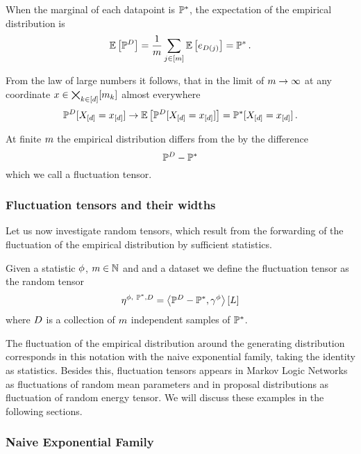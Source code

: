 When the marginal of each datapoint is $\mathbb{P}^*$, the expectation of the empirical distribution is
\begin{align*}
	\mathbb{E}\left[\mathbb{P}^{D}\right] 
	= \frac{1}{m} \sum_{j\in[m]}  \mathbb{E}\left[e_{D(j)}\right]
	= \mathbb{P}^* \, . 
\end{align*}

From the law of large numbers it follows, that in the limit of $m\rightarrow\infty$ at any coordinate $x\in\bigtimes_{k\in[d]}[m_{k}]$ almost everywhere
	\[ \mathbb{P}^{D}[X_{[d]}=x_{[d]}] \rightarrow \mathbb{E}\left[\mathbb{P}^{D}[X_{[d]}=x_{[d]}]\right] =  \mathbb{P}^*[X_{[d]}=x_{[d]}] \, . \]

At finite $m$ the empirical distribution differs from the by the difference
	\[ \mathbb{P}^{D} - \mathbb{P}^* \]
which we call a fluctuation tensor.


\subsubsection{Fluctuation tensors and their widths}

Let us now investigate random tensors, which result from the forwarding of the fluctuation of the empirical distribution by sufficient statistics.

\begin{definition}
	Given a statistic $\phi$, $m\in\mathbb{N}$ and and a dataset we define the fluctuation tensor as the random tensor
		\[ \expfamfluctuation = \sbcontractionof{\empdistribution-\gendistribution,\sencsstat}{\selvariable} \]
	where $D$ is a collection of $m$ independent samples of $\mathbb{P}^*$.
\end{definition}

The fluctuation of the empirical distribution around the generating distribution corresponds in this notation with the naive exponential family, taking the identity as statistics.
Besides this, fluctuation tensors appears in Markov Logic Networks as fluctuations of random mean parameters and in proposal distributions as fluctuation of random energy tensor.
We will discuss these examples in the following sections.


\subsubsection{Naive Exponential Family}


